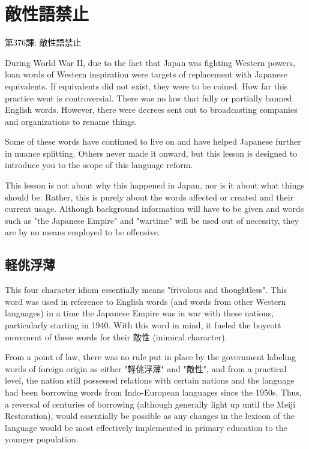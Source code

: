     
\chapter{敵性語禁止}

\begin{center}
\begin{Large}
第376課: 敵性語禁止 
\end{Large}
\end{center}
 
\par{ During World War II, due to the fact that Japan was fighting Western powers, loan words of Western inspiration were targets of replacement with Japanese equivalents. If equivalents did not exist, they were to be coined. How far this practice went is controversial. There was no law that fully or partially banned English words. However, there were decrees sent out to broadcasting companies and organizations to rename things. }

\par{ Some of these words have continued to live on and have helped Japanese further in nuance splitting. Others never made it onward, but this lesson is designed to introduce you to the scope of this language reform. }

\par{ This lesson is not about why this happened in Japan, nor is it about what things should be. Rather, this is purely about the words affected or created and their current usage. Although background information will have to be given and words such as "the Japanese Empire" and "wartime" will be used out of necessity, they are by no means employed to be offensive. }
      
\section{軽佻浮薄}
 
\par{ This four character idiom essentially means "frivolous and thoughtless". This word was used in reference to English words (and words from other Western languages) in a time the Japanese Empire was in war with these nations, particularly starting in 1940. With this word in mind, it fueled the boycott movement of these words for their 敵性 (inimical character). }

\par{ From a point of law, there was no rule put in place by the government labeling words of foreign origin as either "軽佻浮薄" and "敵性", and from a practical level, the nation still possessed relations with certain nations and the language had been borrowing words from Indo-European languages since the 1950s. Thus, a reversal of centuries of borrowing (although generally light up until the Meiji Restoration), would essentially be possible as any changes in the lexicon of the language would be most effectively implemented in primary education to the younger population. }

